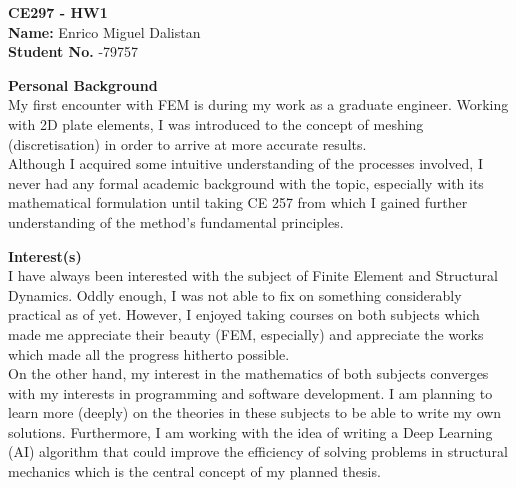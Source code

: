 \documentclass[12pt,a4paper]{article}
\begin{document}
\noindent \textbf{CE297 - HW1} \\
\textbf{Name:} \noindent Enrico Miguel Dalistan \\
\textbf{Student No.} -79757

\bigskip
\bigskip
\bigskip

\noindent \textbf{Personal Background} \\

\noindent My first encounter with FEM is during my work as a graduate engineer.
Working with 2D plate elements, I was introduced to the concept of meshing (discretisation)
in order to arrive at more accurate results. \\

\noindent Although I acquired some intuitive understanding of the processes involved, I never had any formal academic background with the topic, especially with its
mathematical formulation until taking CE 257 from which I gained further understanding of
the method's fundamental principles. \\

\bigskip

\noindent \textbf{Interest(s)}\\

\noindent I have always been interested with the subject of Finite Element and Structural Dynamics.
Oddly enough, I was not able to fix on something considerably practical as of yet. However, I enjoyed taking courses on
both subjects which made me appreciate their beauty (FEM, especially) and appreciate the works which made
all the progress hitherto possible.\\

\noindent On the other hand, my interest in the mathematics of both subjects converges with my interests
in programming and software development. I am planning to learn more (deeply) on the theories in these subjects
to be able to write my own solutions. Furthermore, I am working with the idea of writing a Deep Learning (AI)
algorithm that could improve the efficiency of solving problems in structural mechanics
which is the central concept of my planned thesis. \\

\bigskip
\end{document}
